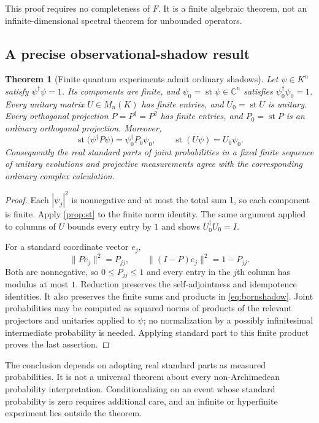 \documentclass[11pt,a4paper]{article}
\numberwithin{equation}{section}
\newtheorem{theorem}{Theorem}[section]
\theoremstyle{definition}
\theoremstyle{remark}
\newcommand{\C}{\mathbb C}
\newcommand{\st}{\operatorname{st}}
\begin{document}
This proof requires no completeness of $F$. It is a finite algebraic theorem,
not an infinite-dimensional spectral theorem for unbounded operators.

\subsection{A precise observational-shadow result}
\begin{theorem}[Finite quantum experiments admit ordinary shadows]\label{thm:quantumshadow}
Let $\psi\in K^n$ satisfy $\psi^\dagger\psi=1$. Its components are finite,
and $\psi_0=\st\psi\in\C^n$ satisfies $\psi_0^\dagger\psi_0=1$.
Every unitary matrix $U\in M_n(K)$ has finite entries, and $U_0=\st U$ is
unitary. Every orthogonal projection $P=P^\dagger=P^2$ has finite entries, and
$P_0=\st P$ is an ordinary orthogonal projection. Moreover,
\begin{equation}\label{eq:bornshadow}
\st\bigl(\psi^\dagger P\psi\bigr)=\psi_0^\dagger P_0\psi_0,
\qquad \st(U\psi)=U_0\psi_0.
\end{equation}
Consequently the real standard parts of joint probabilities in a fixed finite
sequence of unitary evolutions and projective measurements agree with the
corresponding ordinary complex calculation.
\end{theorem}
\begin{proof}
Each $|\psi_j|^2$ is nonnegative and at most the total sum $1$, so each
component is finite. Apply \cref{prop:st} to the finite norm identity.
The same argument applied to columns of $U$ bounds every entry by $1$ and
shows $U_0^\dagger U_0=I$.

For a standard coordinate vector $e_j$,
\[
\|Pe_j\|^2=P_{jj},\qquad
\|(I-P)e_j\|^2=1-P_{jj}.
\]
Both are nonnegative, so $0\le P_{jj}\le1$ and every entry in the $j$th column
has modulus at most $1$. Reduction preserves the self-adjointness and
idempotence identities. It also preserves the finite sums and products in
\eqref{eq:bornshadow}. Joint probabilities may be computed as squared norms of
products of the relevant projectors and unitaries applied to $\psi$; no
normalization by a possibly infinitesimal intermediate probability is needed.
Applying standard part to this finite product proves the last assertion.
\end{proof}

The conclusion depends on adopting real standard parts as measured
probabilities. It is not a universal theorem about every non-Archimedean
probability interpretation. Conditionalizing on an event whose standard
probability is zero requires additional care, and an infinite or hyperfinite
experiment lies outside the theorem.
\end{document}
